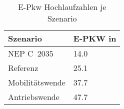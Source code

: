 {
\renewcommand{\arraystretch}{1.2}%
\begin{table}[H]
	\begin{center}
		\caption{E-Pkw Hochlaufzahlen je Szenario}
		\begin{tabu} to 0.6\textwidth {X[1] X[2, r]}
			\hline
			Szenario         & E-PKW in \si{\MioStk}	\\ \hline
			NEP C~\num{2035} & \num{14.0}               \\
			Referenz         & \num{25.1}               \\
			Mobilitätswende  & \num{37.7}               \\
			Antriebswende    & \num{47.7}               \\ \hline
		\end{tabu}
		\label{tab:SzenarienRampUp}
	\end{center}
	\vspace{-3mm}%
\end{table}
}